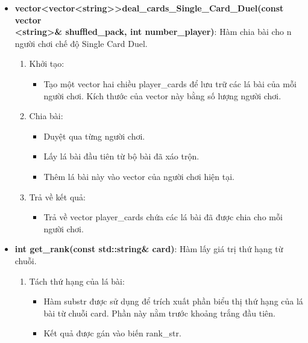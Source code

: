 \documentclass{article}
\begin{document}
\begin{itemize}
    \item \textbf{vector<vector<string>>deal\_cards\_Single\_Card\_Duel(const vector\\<string>\& shuffled\_pack, int number\_player)}: Hàm chia bài cho n người chơi chế độ Single Card Duel.
    \begin{description}
        \begin{enumerate}
            \item Khởi tạo:
                \begin{itemize}
                    \item Tạo một vector hai chiều player\_cards để lưu trữ các lá bài của mỗi người chơi. Kích thước của vector này bằng số lượng người chơi.
                \end{itemize}
            \item Chia bài:
                \begin{itemize}
                    \item Duyệt qua từng người chơi.
                    \item Lấy lá bài đầu tiên từ bộ bài đã xáo trộn.
                    \item Thêm lá bài này vào vector của người chơi hiện tại.
                \end{itemize}
            \item Trả về kết quả:
                \begin{itemize}
                    \item Trả về vector player\_cards chứa các lá bài đã được chia cho mỗi người chơi.
                \end{itemize}
        \end{enumerate}
\end{description}
    \item \textbf{int get\_rank(const std::string\& card)}: Hàm lấy giá trị thứ hạng từ chuỗi.
    \begin{description}
            \begin{enumerate}
            \item Tách thứ hạng của lá bài:
                \begin{itemize}
                    \item Hàm substr được sử dụng để trích xuất phần biểu thị thứ hạng của lá bài từ chuỗi card. Phần này nằm trước khoảng trắng đầu tiên.
                    \item Kết quả được gán vào biến rank\_str.
                \end{itemize}

\end{enumerate}
\end{description}
\end{itemize}
\end{document}
